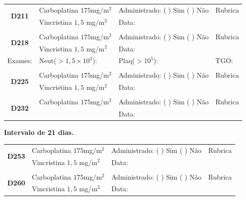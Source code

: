 \documentclass[11pt,a4paper,oldfontcommands]{memoir}
\begin{document}
\begin{center}
\begin{table}[H]
\begin{tabular}{p{1.3cm}p{4.9cm}|p{4.7cm}|p{3cm}}
    \hline
    \multicolumn{1}{c|}{\multirow{2}{*}{\textbf{D211}}}&{Carboplatina \(175\)mg/m\(^2\)}&{Administrado: (  ) Sim (  ) Não}&{Rubrica}\\
    \multicolumn{1}{c|}{}&{Vincristina \(1,5\) mg/m\(^2\)}&{Data:}&\\
    \hline
    \\
    \hline
    \multicolumn{1}{c|}{\multirow{2}{*}{\textbf{D218}}}&{Carboplatina \(175\)mg/m\(^2\)}&{Administrado: (  ) Sim (  ) Não}&{Rubrica}\\
    \multicolumn{1}{c|}{}&{Vincristina \(1,5\) mg/m\(^2\)}&{Data:}&\\
    \hline
    \multicolumn{1}{c|}{Exames:}&{Neut(\(>1,5\times10^3\)):}&{Plaq(\(>10^5\)):}&{TGO:}
    \\
    \hline
    \\
    \hline
    \multicolumn{1}{c|}{\multirow{2}{*}{\textbf{D225}}}&{Carboplatina \(175\)mg/m\(^2\)}&{Administrado: (  ) Sim (  ) Não}&{Rubrica}\\
    \multicolumn{1}{c|}{}&{Vincristina \(1,5\) mg/m\(^2\)}&{Data:}&\\
    \hline
    \\
    \hline
    \multicolumn{1}{c|}{\multirow{2}{*}{\textbf{D232}}}&{Carboplatina \(175\)mg/m\(^2\)}&{Administrado: (  ) Sim (  ) Não}&{Rubrica}\\
	\multicolumn{1}{c|}{}&&{Data:}&\\
    \hline
\end{tabular}
\end{table}
\textbf{Intervalo de 21 dias.}
\begin{table}[H]
\begin{tabular}{p{1.3cm}p{4.9cm}|p{4.7cm}|p{3cm}}
    \hline
    \multicolumn{1}{c|}{\multirow{2}{*}{\textbf{D253}}}&{Carboplatina \(175\)mg/m\(^2\)}&{Administrado: (  ) Sim (  ) Não}&{Rubrica}\\
    \multicolumn{1}{c|}{}&{Vincristina \(1,5\) mg/m\(^2\)}&{Data:}&\\
    \hline
    \\
    \hline
    \multicolumn{1}{c|}{\multirow{2}{*}{\textbf{D260}}}&{Carboplatina \(175\)mg/m\(^2\)}&{Administrado: (  ) Sim (  ) Não}&{Rubrica}\\
    \multicolumn{1}{c|}{}&{Vincristina \(1,5\) mg/m\(^2\)}&{Data:}&\\
    \hline
    

\end{tabular}
\end{table}
\end{center}
\end{document}
